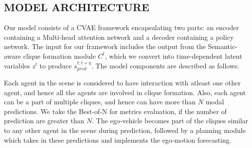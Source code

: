 \documentclass{article}
\begin{document}
\subsection{MODEL ARCHITECTURE}

Our model consists of a CVAE framework encapsulating two parts: an encoder containing a Multi-head attention network and a decoder containing a policy network. The input for our framework includes the output from the Semantic-aware clique formation module $C^t$, which we convert into time-dependent latent variables $z^t$  to produce $s_{pred}^{t:t+\eta}$. The model components are described as follows:

Each agent in the scene is considered to have interaction with atleast one other agent, and hence all the agents are involved in clique formation. Also, each agent can be a part of multiple cliques, and hence can have more than $N$ modal predictions. We take the Best-of-N for metrics evaluation, if the number of prediction are greater than $N$. The ego-vehicle becomes part of the cliques similar to any other agent in the scene during prediction, followed by a planning module which takes in these predictions and implements the ego-motion forecasting.
\end{document}
